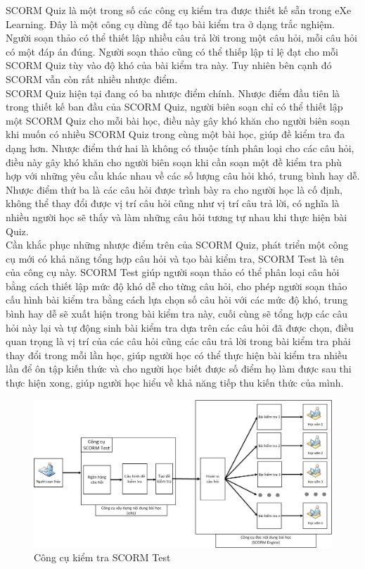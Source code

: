 	SCORM Quiz là một trong số các công cụ kiểm tra được thiết kế sẵn trong eXe Learning. Đây là một công cụ dùng để tạo bài kiểm tra ở dạng trắc nghiệm. Người soạn thảo có thể thiết lập nhiều câu trả lời trong một câu hỏi, mỗi câu hỏi có một đáp án đúng. Người soạn thảo cũng có thể thiếp lập tỉ lệ đạt cho mỗi SCORM Quiz tùy vào độ khó của bài kiểm tra này. Tuy nhiên bên cạnh đó SCORM vẫn còn rất nhiều nhược điểm.\\
	
	SCORM Quiz hiện tại đang có ba nhược điểm chính. Nhược điểm đầu tiên là trong thiết kế ban đầu của SCORM Quiz, người biên soạn chỉ có thể thiết lập một SCORM Quiz cho mỗi bài học, điều này gây khó khăn cho người biên soạn khi muốn có nhiều SCORM Quiz trong cùng một bài học, giúp đề kiểm tra đa dạng hơn. Nhược điểm thứ hai là không có thuộc tính phân loại cho các câu hỏi, điều này gây khó khăn cho người biên soạn khi cần soạn một đề kiểm tra phù hợp với những yêu cầu khác nhau về các số lượng câu hỏi khó, trung bình hay dễ. Nhược điểm thứ ba là các câu hỏi được trình bày ra cho người học là cố định, không thể thay đổi được vị trí câu hỏi cũng như vị trí câu trả lời, có nghĩa là nhiều người học sẽ thấy và làm những câu hỏi tương tự nhau khi thực hiện bài Quiz.\\
	
	Cần khắc phục những nhược điểm trên của SCORM Quiz, phát triển một công cụ mới có khả năng tổng hợp câu hỏi và tạo bài kiểm tra, SCORM Test là tên của công cụ này. SCORM Test giúp người soạn thảo có thể phân loại câu hỏi bằng cách thiết lập mức độ khó dễ cho từng câu hỏi, cho phép người soạn thảo cấu hình bài kiểm tra bằng cách lựa chọn số câu hỏi với các mức độ khó, trung bình hay dễ sẽ xuất hiện trong bài kiểm tra này, cuối cùng sẽ tổng hợp các câu hỏi này lại và tự động sinh bài kiểm tra dựa trên các câu hỏi đã được chọn, điều quan trọng là vị trí của các câu hỏi cũng các câu trả lời trong bài kiểm tra phải thay đổi trong mỗi lần học, giúp người học có thể thực hiện bài kiểm tra nhiều lần để ôn tập kiến thức và cho người học biết được số điểm họ làm được sau thi thực hiện xong, giúp người học hiểu về khả năng tiếp thu kiến thức của mình.
	
\begin{center}
	\begin{figure}[htp]
		\begin{center}
			\includegraphics[width=16cm]{Chapter1/Pictures/picture15.png}
		\end{center}
		\caption{Công cụ kiểm tra SCORM Test}
		\label{refpicture14}
	\end{figure}
\end{center}
	
